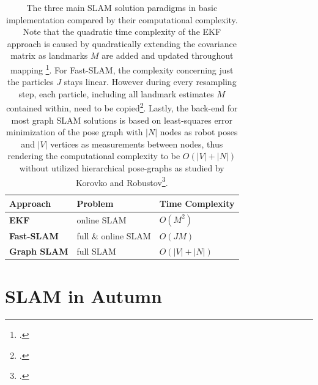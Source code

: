 \begin{table}[]
	\centering
	\begin{tabular}{|l|l|l|}
		\hline
		\textbf{Approach}   & \textbf{Problem}    & \textbf{Time Complexity} \\ \hline
		\textbf{EKF}        & online SLAM         & $O(M^{2})$               \\ \hline
		\textbf{Fast-SLAM}  & full \& online SLAM & $O(J M)$                 \\ \hline
		\textbf{Graph SLAM} & full  SLAM          & $O(|V| + |N|)$           \\ \hline
	\end{tabular}
	\caption{The three main SLAM solution paradigms in basic implementation compared by their computational complexity. Note that the quadratic time complexity of the EKF approach is caused by quadratically extending the covariance matrix as landmarks $M$ are added and updated throughout mapping \footcite{durrantSlam2006}.
		For Fast-SLAM, the complexity concerning just the particles $J$ stays linear. However during every resampling step, each particle, including all landmark estimates $M$ contained within, need to be copied\footcite{montemerlo2002fastslam}.
		Lastly, the back-end for most graph SLAM solutions is based on least-squares error minimization of the pose graph with $|N|$ nodes as robot poses and $|V|$ vertices as measurements between nodes, thus rendering the computational complexity to be  $O(|V| + |N|)$ without utilized hierarchical pose-graphs as studied by Korovko and Robustov\footcite{korovko2021partial}. 
	}
	\label{tab:slamComparison}
\end{table}

\section{SLAM in Autumn}


